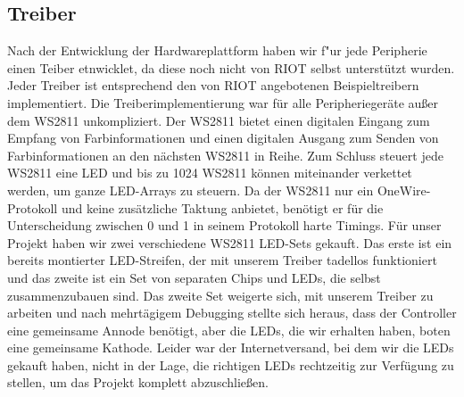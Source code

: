\documentclass[a4paper]{article}
\begin{document}
  \subsection{Treiber}
    \label{sec:hardware_driver}
    Nach der Entwicklung der Hardwareplattform haben wir f"ur jede Peripherie
    einen Teiber etnwicklet, da diese noch nicht von RIOT selbst unterstützt
    wurden. Jeder Treiber ist entsprechend den von RIOT angebotenen
    Beispieltreibern implementiert. Die Treiberimplementierung war für alle
    Peripheriegeräte außer dem WS2811 unkompliziert. Der WS2811 bietet einen
    digitalen Eingang zum Empfang von Farbinformationen und einen digitalen
    Ausgang zum Senden von Farbinformationen an den nächsten WS2811 in Reihe.
    Zum Schluss steuert jede WS2811 eine LED und bis zu 1024 WS2811 können
    miteinander verkettet werden, um ganze LED-Arrays zu steuern. Da der WS2811
    nur ein OneWire-Protokoll und keine zusätzliche Taktung anbietet, benötigt
    er für die Unterscheidung zwischen 0 und 1 in seinem Protokoll harte
    Timings. Für unser Projekt haben wir zwei verschiedene WS2811 LED-Sets
    gekauft. Das erste ist ein bereits montierter LED-Streifen, der mit unserem
    Treiber tadellos funktioniert und das zweite ist ein Set von separaten
    Chips und LEDs, die selbst zusammenzubauen sind. Das zweite Set weigerte
    sich, mit unserem Treiber zu arbeiten und nach mehrtägigem Debugging
    stellte sich heraus, dass der Controller eine gemeinsame Annode benötigt,
    aber die LEDs, die wir erhalten haben, boten eine gemeinsame Kathode.
    Leider war der Internetversand, bei dem wir die LEDs gekauft haben, nicht
    in der Lage, die richtigen LEDs rechtzeitig zur Verfügung
    zu stellen, um das Projekt komplett abzuschließen.
\end{document}
